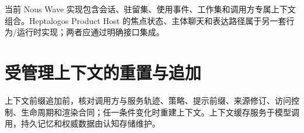 当前 Nous Wave 实现包含会话、驻留集、使用事件、工作集和调用方专属上下文组合。Heptalogos Product Host 的焦点状态、主体聊天和表达路径属于另一套行为/运行时实现；两者应通过明确接口集成。\cite{nous-code-snapshot,heptalogos-code-snapshot}

\section{受管理上下文的重置与追加}

上下文前缀追加前，核对调用方与服务轨迹、策略、提示前缀、来源修订、访问控制、生命周期和渲染合同；任一条件变化时重建上下文。上下文缓存服务于模型调用，持久记忆和权威数据由认知存储维护。
